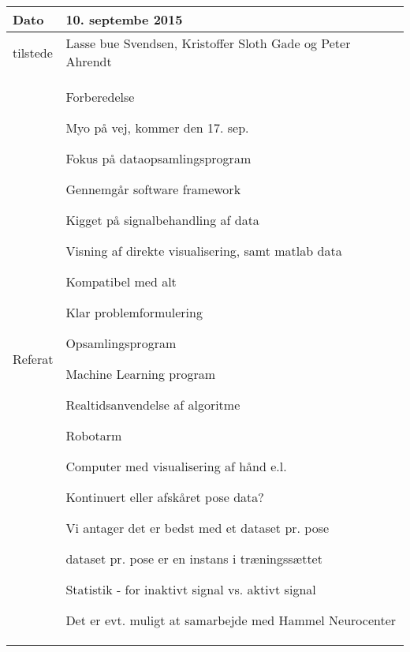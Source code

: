 \begin{center}
	\begin{tabular}{| l | p{10cm} |}
		\hline
		Dato		& 10. septembe 2015\\ \hline
		tilstede 	& Lasse bue Svendsen, Kristoffer Sloth Gade og Peter Ahrendt\\ \hline
		Referat		& \vspace{-5mm}\begin{myEnumerate}
			\item Forberedelse
			\begin{myItemize}				
				\item Myo på vej, kommer den 17. sep.
				\item Fokus på dataopsamlingsprogram
				\begin{myItemize}
					\item Gennemgår software framework
					\item Kigget på signalbehandling af data
					\item Visning af direkte visualisering, samt matlab data
				\end{myItemize}
				\begin{myItemize}
					\item Kompatibel med alt
				\end{myItemize}
			\end{myItemize}
			\item Klar problemformulering
			\begin{myItemize}
				\item Opsamlingsprogram
				\item Machine Learning program
				\item Realtidsanvendelse af algoritme
				\begin{myItemize}
					\item Robotarm
					\item Computer med visualisering af hånd  e.l.
				\end{myItemize}
			\end{myItemize}
			\item Kontinuert eller afskåret pose data?
			\begin{myItemize}
				\item Vi antager det er bedst med et dataset pr. pose
				\item dataset pr. pose er en instans i træningssættet
				\item Statistik - for inaktivt signal vs. aktivt signal
			\end{myItemize}
			\item Det er evt. muligt at samarbejde med Hammel Neurocenter
		\end{myEnumerate}\\ 	
		\hline
	\end{tabular}
\end{center}

